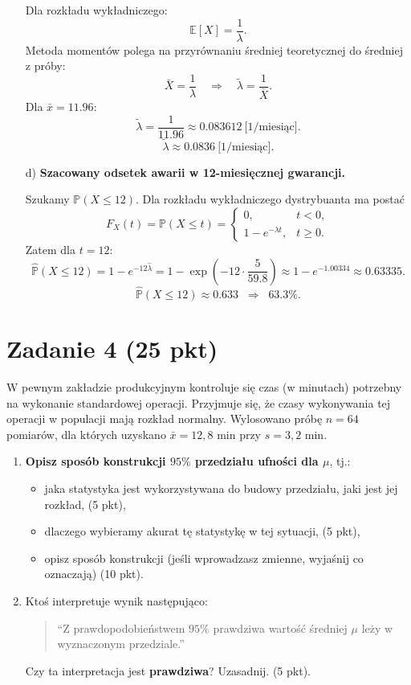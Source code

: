 \documentclass[polish, 10pt]{extarticle}
\begin{document}
\begin{enumerate}
Dla rozkładu wykładniczego:
\[
\mathbb{E}[X]=\frac{1}{\lambda}.
\]
Metoda momentów polega na przyrównaniu średniej teoretycznej do średniej z próby:
\[
\bar X=\frac{1}{\lambda}
\quad\Longrightarrow\quad
\tilde\lambda=\frac{1}{\bar X}.
\]
Dla $\bar x=11.96$:
\[
\tilde\lambda=\frac{1}{11.96}\approx 0.083612\ \text{[1/miesiąc]}.
\]
\[
\boxed{\tilde\lambda \approx 0.0836\ \text{[1/miesiąc]}.}
\]

\item[d)] \textbf{Szacowany odsetek awarii w 12-miesięcznej gwarancji.}

Szukamy $\mathbb{P}(X\le 12)$. Dla rozkładu wykładniczego dystrybuanta ma postać
\[
F_X(t)=\mathbb{P}(X\le t)=
\begin{cases}
0, & t<0,\\
1-e^{-\lambda t}, & t\ge 0.
\end{cases}
\]
Zatem dla $t=12$:
\[
\widehat{\mathbb{P}}(X\le 12)=1-e^{-12\hat\lambda}
=1-\exp\!\left(-12\cdot \frac{5}{59.8}\right)
\approx 1-e^{-1.00334}\approx 0.63335.
\]
\[
\boxed{\widehat{\mathbb{P}}(X\le 12)\approx 0.633 \;\;\Rightarrow\;\; 63.3\%.}
\]

\end{enumerate}

\section*{Zadanie 4 (25 pkt)}
W pewnym zakładzie produkcyjnym kontroluje się czas (w minutach) potrzebny na wykonanie standardowej operacji. Przyjmuje się, że czasy wykonywania tej operacji w populacji mają rozkład normalny. Wylosowano próbę \textbf{$n = 64$} pomiarów, dla których uzyskano $\bar{x} = 12{,}8$ min przy $s = 3{,}2$ min.

\begin{enumerate}
    \item \textbf{Opisz sposób konstrukcji $95\%$ przedziału ufności dla $\mu$}, tj.:
    \begin{itemize}
        \item jaka statystyka jest wykorzystywana do budowy przedziału, jaki jest jej rozkład, \hfill (5 pkt),
        \item dlaczego wybieramy akurat tę statystykę w tej sytuacji, \hfill (5 pkt),
        \item opisz sposób konstrukcji (jeśli wprowadzasz zmienne, wyjaśnij  co oznaczają) \hfill (10 pkt).
    \end{itemize}

    \item Ktoś interpretuje wynik następująco:
    \begin{quote}
    ``Z prawdopodobieństwem $95\%$ prawdziwa wartość średniej $\mu$ leży w wyznaczonym przedziale.''
    \end{quote}
    Czy ta interpretacja jest \textbf{prawdziwa}? Uzasadnij. \hfill (5 pkt).
\end{enumerate}
\end{document}
